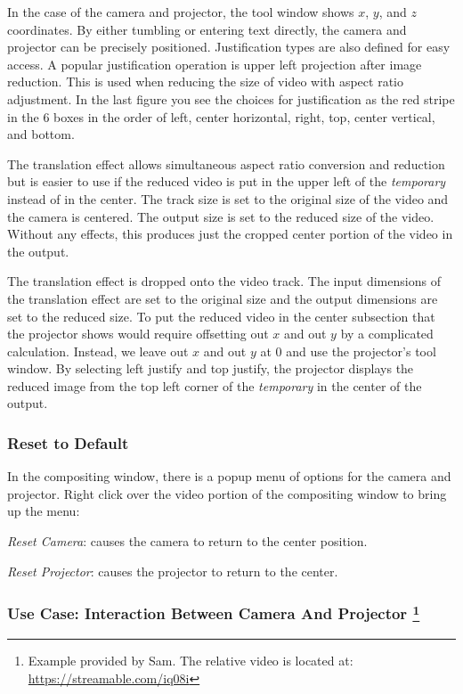 In the case of the camera and projector, the tool window shows $x$, $y$, and $z$ coordinates. 
By either tumbling or entering text directly, the camera and projector can be precisely positioned.  
Justification types are also defined for easy access. 
A popular justification operation is upper left projection after image reduction. 
This is used when reducing the size of video with aspect ratio adjustment.  
In the last figure you see the choices for justification as the red stripe in the 6 boxes in the order of left, center horizontal, right, top, center vertical, and bottom.

The translation effect allows simultaneous aspect ratio conversion and reduction but is easier to use if the reduced video is put in the upper left of the \textit{temporary} instead of in the center. 
The track size is set to the original size of the video and the camera is centered. 
The output size is set to the reduced size of the video. 
Without any effects, this produces just the cropped center portion of the video in the output.

The translation effect is dropped onto the video track. The input dimensions of the translation effect are set to the original size and the output dimensions are set to the reduced size. 
To put the reduced video in the center subsection that the projector shows would require offsetting out $x$ and out $y$ by a complicated calculation. 
Instead, we leave out $x$ and out $y$ at 0 and use the projector's tool window. 
By selecting left justify and top justify, the projector displays the reduced image from the top left corner of the \textit{temporary} in the center of the output.

\subsubsection*{Reset to Default}%
\label{ssub:reset_default}

In the compositing window, there is a popup menu of options for the camera and projector. Right click over the video portion of the compositing window to bring up the menu:

\textit{Reset Camera}: causes the camera to return to the center position.
    	
\textit{Reset Projector}: causes the projector to return to the center.

\subsubsection*{Use Case: Interaction Between Camera And Projector \protect\footnote{Example provided by Sam. The relative video is located at: \url{https://streamable.com/iq08i}}}%
\label{ssub:use_case_interaction_camera_projector}

